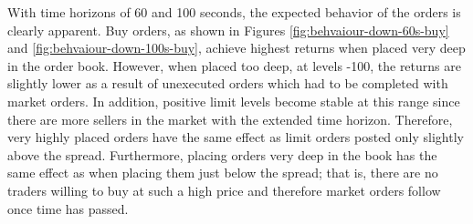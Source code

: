 With time horizons of 60 and 100 seconds, the expected behavior of the orders is clearly apparent.
Buy orders, as shown in Figures \ref{fig:behvaiour-down-60s-buy} and \ref{fig:behvaiour-down-100s-buy}, achieve highest returns when placed very deep in the order book.
However, when placed too deep, at levels -100, the returns are slightly lower as a result of unexecuted orders which had to be completed with market orders.
In addition, positive limit levels become stable at this range since there are more sellers in the market with the extended time horizon.  Therefore, very highly placed orders have the same effect as limit orders posted only slightly above the spread.
Furthermore, placing orders very deep in the book has the same effect as when placing them just below the spread; that is, there are no traders willing to buy at such a high price and therefore market orders follow once time has passed.
\vfill
\newpage
